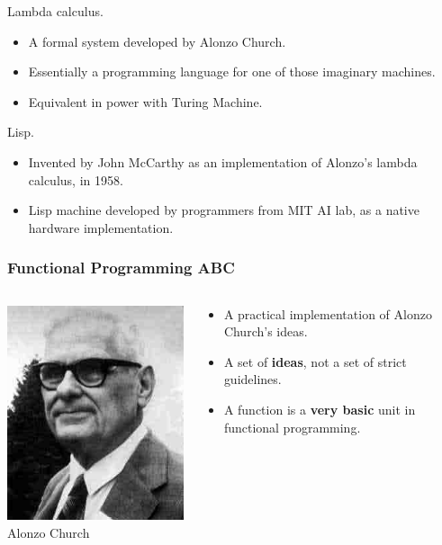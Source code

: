 \documentclass[12pt,hyperref=true,mathserif]{beamer}
\begin{document}
\begin{frame}
  Lambda calculus.
  \begin{itemize}
  \item A formal system developed by Alonzo Church.
  \item Essentially a programming language for one of those imaginary
    machines.
  \item Equivalent in power with Turing Machine.
  \end{itemize}
  Lisp.
  \begin{itemize}
  \item Invented by John McCarthy as an implementation of Alonzo's
    lambda calculus, in 1958.
  \item Lisp machine developed by programmers from MIT AI lab, as a
    native hardware implementation.
  \end{itemize}
\end{frame}

\begin{frame}
  \frametitle{Functional Programming ABC}
  \begin{columns}
    \begin{column}{0.5\textwidth}
      \includegraphics[scale=0.4]{Figure/Alonzo_Church.jpg}\\
      Alonzo Church
    \end{column}
    \begin{column}{0.5\textwidth}
      \begin{itemize}
      \item A practical implementation of Alonzo Church's ideas.
      \item A set of \textbf{ideas}, not a set of strict
        guidelines.
      \item A function is a \textbf{very basic} unit in
        functional programming.
      \end{itemize}
    \end{column}
  \end{columns}
\end{frame}
\end{document}
